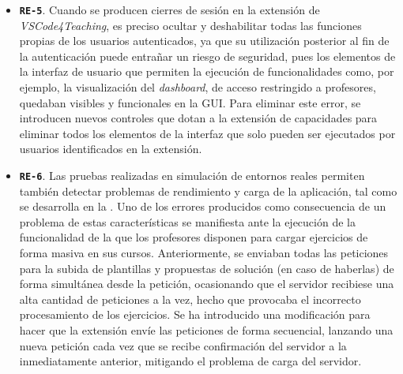 \begin{itemize}
    \item \texttt{\textbf{RE-5}}. Cuando se producen cierres de sesión en la extensión de \textit{VSCode4Teaching}, es preciso ocultar y deshabilitar todas las funciones propias de los usuarios autenticados, ya que su utilización posterior al fin de la autenticación puede entrañar un riesgo de seguridad, pues los elementos de la interfaz de usuario que permiten la ejecución de funcionalidades como, por ejemplo, la visualización del \textit{dashboard}, de acceso restringido a profesores, quedaban visibles y funcionales en la GUI. Para eliminar este error, se introducen nuevos controles que dotan a la extensión de capacidades para eliminar todos los elementos de la interfaz que solo pueden ser ejecutados por usuarios identificados en la extensión.
    \item \texttt{\textbf{RE-6}}. Las pruebas realizadas en simulación de entornos reales permiten también detectar problemas de rendimiento y carga de la aplicación, tal como se desarrolla en la . Uno de los errores producidos como consecuencia de un problema de estas características se manifiesta ante la ejecución de la funcionalidad de la que los profesores disponen para cargar ejercicios de forma masiva en sus cursos. Anteriormente, se enviaban todas las peticiones para la subida de plantillas y propuestas de solución (en caso de haberlas) de forma simultánea desde la petición, ocasionando que el servidor recibiese una alta cantidad de peticiones a la vez, hecho que provocaba el incorrecto procesamiento de los ejercicios. Se ha introducido una modificación para hacer que la extensión envíe las peticiones de forma secuencial, lanzando una nueva petición cada vez que se recibe confirmación del servidor a la inmediatamente anterior, mitigando el problema de carga del servidor.
\end{itemize}
